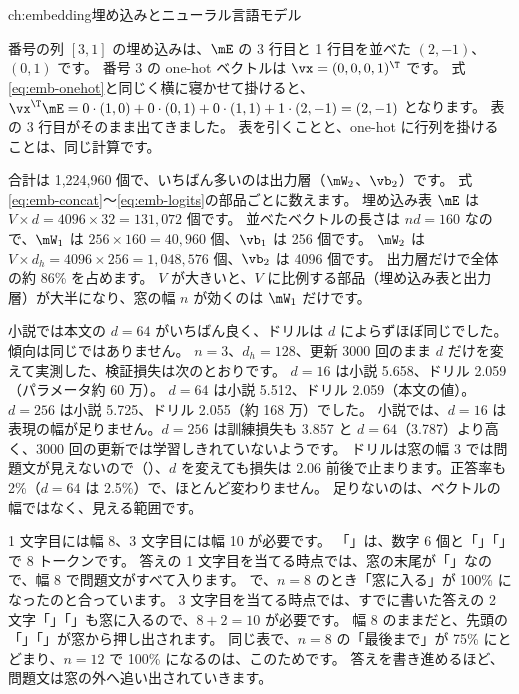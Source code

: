 \begin{answers}{ch:embedding}{埋め込みとニューラル言語モデル}
\item 番号の列 $[3,1]$ の埋め込みは、$\mE$ の 3 行目と 1 行目を並べた $(2,-1)$、$(0,1)$ です。
番号 3 の one-hot ベクトルは $\vx=(0,0,0,1)^\T$ です。
式\eqref{eq:emb-onehot}と同じく横に寝かせて掛けると、
$\vx^\T\mE=0\cdot(1,0)+0\cdot(0,1)+0\cdot(1,1)+1\cdot(2,-1)=(2,-1)$ となります。
表の 3 行目がそのまま出てきました。
表を引くことと、one-hot に行列を掛けることは、同じ計算です。

\item 合計は 1,224,960 個で、いちばん多いのは出力層（$\mW_2$、$\vb_2$）です。
式\eqref{eq:emb-concat}〜\eqref{eq:emb-logits}の部品ごとに数えます。
埋め込み表 $\mE$ は $V\times d=4096\times32=131{,}072$ 個です。
並べたベクトルの長さは $nd=160$ なので、$\mW_1$ は $256\times160=40{,}960$ 個、$\vb_1$ は 256 個です。
$\mW_2$ は $V\times d_h=4096\times256=1{,}048{,}576$ 個、$\vb_2$ は 4096 個です。
出力層だけで全体の約 86\% を占めます。
$V$ が大きいと、$V$ に比例する部品（埋め込み表と出力層）が大半になり、窓の幅 $n$ が効くのは $\mW_1$ だけです。

\item 小説では本文の $d=64$ がいちばん良く、ドリルは $d$ によらずほぼ同じでした。傾向は同じではありません。
$n=3$、$d_h=128$、更新 3000 回のまま $d$ だけを変えて実測した、検証損失は次のとおりです。
$d=16$ は小説 5.658、ドリル 2.059（パラメータ約 60 万）。
$d=64$ は小説 5.512、ドリル 2.059（本文の値）。
$d=256$ は小説 5.725、ドリル 2.055（約 168 万）でした。
小説では、$d=16$ は表現の幅が足りません。$d=256$ は訓練損失も 3.857 と $d=64$（3.787）より高く、3000 回の更新では学習しきれていないようです。
ドリルは窓の幅 3 では問題文が見えないので（）、$d$ を変えても損失は 2.06 前後で止まります。正答率も 2\%（$d=64$ は 2.5\%）で、ほとんど変わりません。
足りないのは、ベクトルの幅ではなく、見える範囲です。

\item 1 文字目には幅 8、3 文字目には幅 10 が必要です。
「」は、数字 6 個と「\code{+}」「\code{=}」で 8 トークンです。
答えの 1 文字目を当てる時点では、窓の末尾が「\code{=}」なので、幅 8 で問題文がすべて入ります。
で、$n=8$ のとき「窓に入る」が 100\% になったのと合っています。
3 文字目を当てる時点では、すでに書いた答えの 2 文字「」「」も窓に入るので、$8+2=10$ が必要です。
幅 8 のままだと、先頭の「」「」が窓から押し出されます。
同じ表で、$n=8$ の「最後まで」が 75\% にとどまり、$n=12$ で 100\% になるのは、このためです。
答えを書き進めるほど、問題文は窓の外へ追い出されていきます。


\end{answers}
